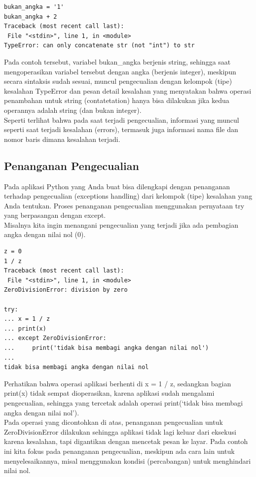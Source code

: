 \begin{verbatim}
bukan_angka = '1'
bukan_angka + 2
Traceback (most recent call last):
 File "<stdin>", line 1, in <module>
TypeError: can only concatenate str (not "int") to str
\end{verbatim}
Pada contoh tersebut, variabel bukan\_angka berjenis string, sehingga saat mengoperasikan variabel tersebut dengan angka (berjenis integer), meskipun secara sintaksis sudah sesuai, muncul pengecualian dengan kelompok (tipe) kesalahan TypeError dan pesan detail kesalahan yang menyatakan bahwa operasi penambahan untuk string (contatetation) hanya bisa dilakukan jika kedua operannya adalah string (dan bukan integer).\\

Seperti terlihat bahwa pada saat terjadi pengecualian, informasi yang muncul seperti saat terjadi kesalahan (errors), termasuk juga informasi nama file dan nomor baris dimana kesalahan terjadi.\\

\subsection{Penanganan Pengecualian}

Pada aplikasi Python yang Anda buat bisa dilengkapi dengan penanganan terhadap pengecualian (exceptions handling) dari kelompok (tipe) kesalahan yang Anda tentukan. Proses penanganan pengecualian menggunakan pernyataan try yang berpasangan dengan except.\\

Misalnya kita ingin menangani pengecualian yang terjadi jika ada pembagian angka dengan nilai nol (0).\\
\begin{verbatim}
z = 0
1 / z
Traceback (most recent call last):
 File "<stdin>", line 1, in <module>
ZeroDivisionError: division by zero
 
try:
... x = 1 / z
... print(x)
... except ZeroDivisionError:
...     print('tidak bisa membagi angka dengan nilai nol')
...  
tidak bisa membagi angka dengan nilai nol
\end{verbatim}

Perhatikan bahwa operasi aplikasi berhenti di x = 1 / z, sedangkan bagian print(x) tidak sempat dioperasikan, karena aplikasi sudah mengalami pengecualian, sehingga yang tercetak adalah operasi print(‘tidak bisa membagi angka dengan nilai nol’).\\

Pada operasi yang dicontohkan di atas, penanganan pengecualian untuk ZeroDivisionError dilakukan sehingga aplikasi tidak lagi keluar dari eksekusi karena kesalahan, tapi digantikan dengan mencetak pesan ke layar. Pada contoh ini kita fokus pada penanganan pengecualian, meskipun ada cara lain untuk menyelesaikannya, misal menggunakan kondisi (percabangan) untuk menghindari nilai nol.\\

